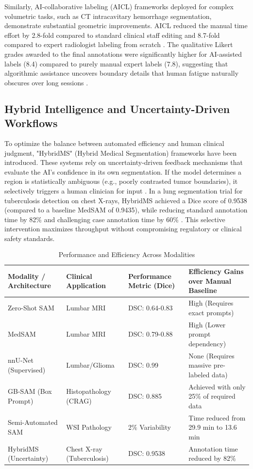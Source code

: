 \documentclass[conference]{IEEEtran}
\begin{document}
Similarly, AI-collaborative labeling (AICL) frameworks deployed for complex volumetric tasks, such as CT intracavitary hemorrhage segmentation, demonstrate substantial geometric improvements. AICL reduced the manual time effort by 2.8-fold compared to standard clinical staff editing and 8.7-fold compared to expert radiologist labeling from scratch \cite{ref20}. The qualitative Likert grades awarded to the final annotations were significantly higher for AI-assisted labels (8.4) compared to purely manual expert labels (7.8), suggesting that algorithmic assistance uncovers boundary details that human fatigue naturally obscures over long sessions \cite{ref20}.

\subsection{Hybrid Intelligence and Uncertainty-Driven Workflows}
To optimize the balance between automated efficiency and human clinical judgment, "HybridMS" (Hybrid Medical Segmentation) frameworks have been introduced. These systems rely on uncertainty-driven feedback mechanisms that evaluate the AI's confidence in its own segmentation. If the model determines a region is statistically ambiguous (e.g., poorly contrasted tumor boundaries), it selectively triggers a human clinician for input \cite{ref21}. In a lung segmentation trial for tuberculosis detection on chest X-rays, HybridMS achieved a Dice score of 0.9538 (compared to a baseline MedSAM of 0.9435), while reducing standard annotation time by 82\% and challenging case annotation time by 60\% \cite{ref21}. This selective intervention maximizes throughput without compromising regulatory or clinical safety standards.

\begin{table}[ht]
\centering
\caption{Performance and Efficiency Across Modalities}
\label{tab:performance}
\renewcommand{\arraystretch}{1.2}
\begin{tabularx}{\linewidth}{@{} l X X X @{}}
\toprule
\textbf{Modality / Architecture} & \textbf{Clinical Application} & \textbf{Performance Metric (Dice)} & \textbf{Efficiency Gains over Manual Baseline} \\
\midrule
Zero-Shot SAM & Lumbar MRI & DSC: 0.64-0.83 & High (Requires exact prompts) \\
MedSAM & Lumbar MRI & DSC: 0.79-0.88 & High (Lower prompt dependency) \\
nnU-Net (Supervised) & Lumbar/Glioma & DSC: 0.99 & None (Requires massive pre-labeled data) \\
GB-SAM (Box Prompt) & Histopathology (CRAG) & DSC: 0.885 & Achieved with only 25\% of required data \\
Semi-Automated SAM & WSI Pathology & 2\% Variability & Time reduced from 29.9 min to 13.6 min \\
HybridMS (Uncertainty) & Chest X-ray (Tuberculosis) & DSC: 0.9538 & Annotation time reduced by 82\% \\
\bottomrule
\end{tabularx}
\end{table}
\end{document}
